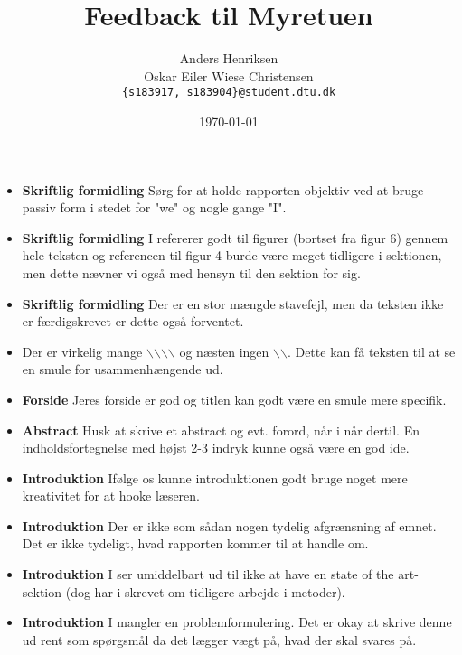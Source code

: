 \documentclass[11pt, fleqn, titlepage]{article}
\title{Feedback til Myretuen}
\author{Anders Henriksen \\ Oskar Eiler Wiese Christensen  \\ \texttt{\{s183917, s183904\}@student.dtu.dk}}
\date{\today}
\begin{document}
	
	\maketitle
	
	\begin{itemize}
		\item \textbf{Skriftlig formidling} Sørg for at holde rapporten objektiv ved at bruge passiv form i stedet for "we" og nogle gange "I".
		
		\item \textbf{Skriftlig formidling} I refererer godt til figurer (bortset fra figur 6) gennem hele teksten og referencen til figur 4 burde være meget tidligere i sektionen, men dette nævner vi også med hensyn til den sektion for sig.
		
		\item \textbf{Skriftlig formidling} Der er en stor mængde stavefejl, men da teksten ikke er færdigskrevet er dette også forventet.
		
		\item Der er virkelig mange $\backslash$$\backslash$$\backslash$$\backslash$ og næsten ingen $\backslash$$\backslash$. Dette kan få teksten til at se en smule for usammenhængende ud.
		
		\item \textbf{Forside} Jeres forside er god og titlen kan godt være en smule mere specifik.
		
		\item \textbf{Abstract} Husk at skrive et abstract og evt. forord, når i når dertil. En indholdsfortegnelse med højst 2-3 indryk kunne også være en god ide.
		
		\item \textbf{Introduktion} Ifølge os kunne introduktionen godt bruge noget mere kreativitet for at hooke læseren.
		
		\item \textbf{Introduktion} Der er ikke som sådan nogen tydelig afgrænsning af emnet. Det er ikke tydeligt, hvad rapporten kommer til at handle om.
		
		\item \textbf{Introduktion} I ser umiddelbart ud til ikke at have en state of the art-sektion (dog har i skrevet om tidligere arbejde i metoder).
		
		\item \textbf{Introduktion} I mangler en problemformulering. Det er okay at skrive denne ud rent som spørgsmål da det lægger vægt på, hvad der skal svares på.
		

\end{itemize}
\end{document}
